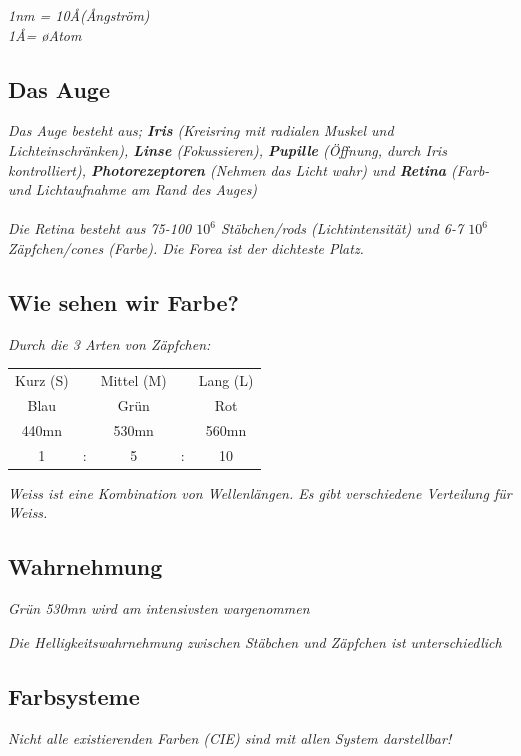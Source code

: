 \textit{1nm = 10\AA (\AA ngström)} \\
\textit{1\AA = \o Atom}

\subsection{Das Auge}

\textit{
    Das Auge besteht aus; \textbf{Iris} (Kreisring mit radialen Muskel und Lichteinschränken),
    \textbf{Linse} (Fokussieren), \textbf{Pupille} (Öffnung, durch Iris kontrolliert), \textbf{Photorezeptoren} (Nehmen das Licht wahr) und \textbf{Retina}
    (Farb- und Lichtaufnahme am Rand des Auges)
} \\
\\
\textit{
    Die Retina besteht aus 75-100 $10^6$ Stäbchen/rods (Lichtintensität) und
    6-7 $10^6$ Zäpfchen/cones (Farbe). Die Forea ist der dichteste Platz.
}

\subsection{Wie sehen wir Farbe?}

\textit{Durch die 3 Arten von Zäpfchen:}

\begin{tabular}{ccccc}
    Kurz (S) & & Mittel (M) & & Lang (L) \\
    Blau     & & Grün       & & Rot \\
    440mn    & & 530mn      & & 560mn \\
    1        &:& 5          &:& 10 \\
\end{tabular}

\textit{
	Weiss ist eine Kombination von Wellenlängen. Es gibt verschiedene Verteilung für Weiss.
}

\subsection{Wahrnehmung}

\textit{Grün 530mn wird am intensivsten wargenommen}

\textit{
    Die Helligkeitswahrnehmung zwischen Stäbchen und
    Zäpfchen ist unterschiedlich
}

\subsection{Farbsysteme}

\textit{
	Nicht alle existierenden Farben (CIE) sind mit allen System darstellbar!
}

